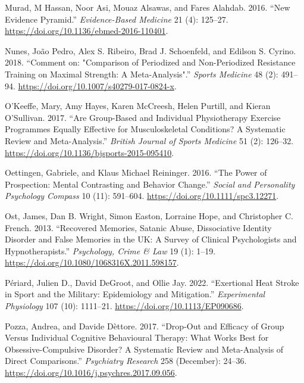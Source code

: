 \documentclass[
  letterpaper,
  DIV=11,
  numbers=noendperiod]{scrreprt}
\newlength{\cslhangindent}
\newenvironment{CSLReferences}[2] %
 {\begin{list}{}{%
  \setlength{\itemindent}{0pt}
  \setlength{\leftmargin}{0pt}
  \setlength{\parsep}{0pt}
  \ifodd #1
   \setlength{\leftmargin}{\cslhangindent}
   \setlength{\itemindent}{-1\cslhangindent}
  \fi
  \setlength{\itemsep}{#2\baselineskip}}}
 {\end{list}}
\begin{document}
\begin{CSLReferences}{1}{0}
Murad, M Hassan, Noor Asi, Mouaz Alsawas, and Fares Alahdab. 2016.
{``New Evidence Pyramid.''} \emph{Evidence-Based Medicine} 21 (4):
125--27. \url{https://doi.org/10.1136/ebmed-2016-110401}.

Nunes, João Pedro, Alex S. Ribeiro, Brad J. Schoenfeld, and Edilson S.
Cyrino. 2018. {``Comment on: "{Comparison} of {Periodized} and
{Non-Periodized Resistance Training} on {Maximal Strength}: {A
Meta-Analysis}".''} \emph{Sports Medicine} 48 (2): 491--94.
\url{https://doi.org/10.1007/s40279-017-0824-x}.

O'Keeffe, Mary, Amy Hayes, Karen McCreesh, Helen Purtill, and Kieran
O'Sullivan. 2017. {``Are Group-Based and Individual Physiotherapy
Exercise Programmes Equally Effective for Musculoskeletal Conditions?
{A} Systematic Review and Meta-Analysis.''} \emph{British Journal of
Sports Medicine} 51 (2): 126--32.
\url{https://doi.org/10.1136/bjsports-2015-095410}.

Oettingen, Gabriele, and Klaus Michael Reininger. 2016. {``The Power of
Prospection: Mental Contrasting and Behavior Change.''} \emph{Social and
Personality Psychology Compass} 10 (11): 591--604.
\url{https://doi.org/10.1111/spc3.12271}.

Ost, James, Dan B. Wright, Simon Easton, Lorraine Hope, and Christopher
C. French. 2013. {``Recovered Memories, Satanic Abuse, {Dissociative
Identity Disorder} and False Memories in the {UK}: A Survey of {Clinical
Psychologists} and {Hypnotherapists}.''} \emph{Psychology, Crime \& Law}
19 (1): 1--19. \url{https://doi.org/10.1080/1068316X.2011.598157}.

Périard, Julien D., David DeGroot, and Ollie Jay. 2022. {``Exertional
Heat Stroke in Sport and the Military: Epidemiology and Mitigation.''}
\emph{Experimental Physiology} 107 (10): 1111--21.
\url{https://doi.org/10.1113/EP090686}.

Pozza, Andrea, and Davide Dèttore. 2017. {``Drop-Out and Efficacy of
Group Versus Individual Cognitive Behavioural Therapy: {What} Works Best
for {Obsessive-Compulsive Disorder}? {A} Systematic Review and
Meta-Analysis of Direct Comparisons.''} \emph{Psychiatry Research} 258
(December): 24--36.
\url{https://doi.org/10.1016/j.psychres.2017.09.056}.


\end{CSLReferences}
\end{document}

